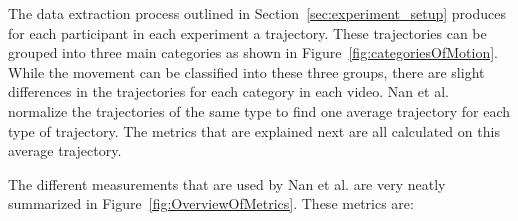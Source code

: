 The data extraction process outlined in Section~\ref{sec:experiment_setup} produces for each participant in each experiment a trajectory. These trajectories can be grouped into three main categories as shown in Figure~\ref{fig:categoriesOfMotion}. While the movement can be classified into these three groups, there are slight differences in the trajectories for each category in each video. Nan et al. normalize the trajectories of the same type to find one average trajectory for each type of trajectory. The metrics that are explained next are all calculated on this average trajectory.


The different measurements that are used by Nan et al. are very neatly summarized in Figure~\ref{fig:OverviewOfMetrics}. These metrics are:

